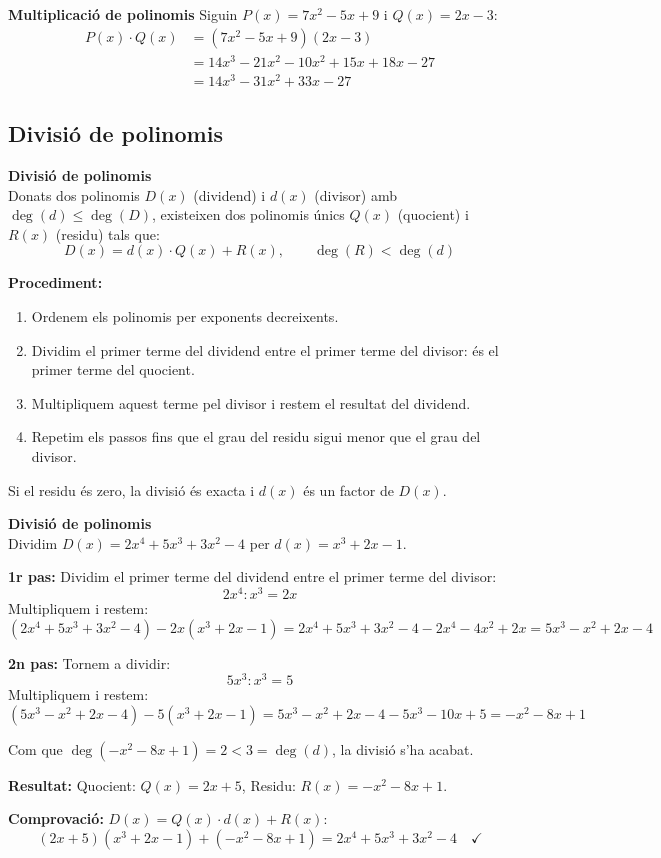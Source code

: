 \documentclass[12pt]{article}
\begin{document}
\begin{exemple}
\textbf{Multiplicació de polinomis}
Siguin $P(x) = 7x^2-5x+9$ i $Q(x) = 2x-3$:
\begin{align*}
P(x) \cdot Q(x) &= (7x^2-5x+9)(2x-3) \\
&= 14x^3 - 21x^2 - 10x^2 + 15x + 18x - 27 \\
&= 14x^3 - 31x^2 + 33x - 27
\end{align*}
\end{exemple}

\subsection{Divisió de polinomis}

\begin{concept}
\textbf{Divisió de polinomis}\\
Donats dos polinomis $D(x)$ (dividend) i $d(x)$ (divisor) amb $\deg(d) \le \deg(D)$, existeixen dos polinomis únics $Q(x)$ (quocient) i $R(x)$ (residu) tals que:
\[
\boxed{D(x) = d(x) \cdot Q(x) + R(x)}, \qquad \deg(R) < \deg(d)
\]

\textbf{Procediment:}
\begin{enumerate}
    \item Ordenem els polinomis per exponents decreixents.
    \item Dividim el primer terme del dividend entre el primer terme del divisor: és el primer terme del quocient.
    \item Multipliquem aquest terme pel divisor i restem el resultat del dividend.
    \item Repetim els passos fins que el grau del residu sigui menor que el grau del divisor.
\end{enumerate}
Si el residu és zero, la divisió és exacta i $d(x)$ és un factor de $D(x)$.
\end{concept}

\begin{exemple}
\textbf{Divisió de polinomis}\\
Dividim $D(x) = 2x^4 + 5x^3 + 3x^2 - 4$ per $d(x) = x^3 + 2x - 1$.

\textbf{1r pas:} Dividim el primer terme del dividend entre el primer terme del divisor:
\[
2x^4 : x^3 = 2x
\]
Multipliquem i restem:
\[
(2x^4+5x^3+3x^2-4) - 2x(x^3+2x-1) = 2x^4+5x^3+3x^2-4 - 2x^4 - 4x^2 + 2x = 5x^3 - x^2 + 2x - 4
\]

\textbf{2n pas:} Tornem a dividir:
\[
5x^3 : x^3 = 5
\]
Multipliquem i restem:
\[
(5x^3-x^2+2x-4) - 5(x^3+2x-1) = 5x^3-x^2+2x-4 - 5x^3 - 10x + 5 = -x^2 - 8x + 1
\]

Com que $\deg(-x^2-8x+1) = 2 < 3 = \deg(d)$, la divisió s'ha acabat.

\textbf{Resultat:} \quad Quocient: $Q(x) = 2x+5$, \quad Residu: $R(x) = -x^2-8x+1$.

\textbf{Comprovació:} $D(x) = Q(x) \cdot d(x) + R(x)$:
\[
(2x+5)(x^3+2x-1) + (-x^2-8x+1) = 2x^4+5x^3+3x^2-4 \quad \checkmark
\]
\end{exemple}
\end{document}
